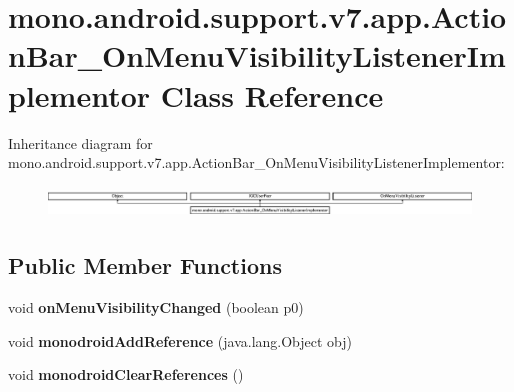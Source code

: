 \hypertarget{classmono_1_1android_1_1support_1_1v7_1_1app_1_1ActionBar__OnMenuVisibilityListenerImplementor}{}\section{mono.\+android.\+support.\+v7.\+app.\+Action\+Bar\+\_\+\+On\+Menu\+Visibility\+Listener\+Implementor Class Reference}
\label{classmono_1_1android_1_1support_1_1v7_1_1app_1_1ActionBar__OnMenuVisibilityListenerImplementor}
Inheritance diagram for mono.\+android.\+support.\+v7.\+app.\+Action\+Bar\+\_\+\+On\+Menu\+Visibility\+Listener\+Implementor\+:\begin{figure}[H]
\begin{center}
\leavevmode
\includegraphics[height=0.809834cm]{classmono_1_1android_1_1support_1_1v7_1_1app_1_1ActionBar__OnMenuVisibilityListenerImplementor}
\end{center}
\end{figure}
\subsection*{Public Member Functions}
\begin{DoxyCompactItemize}
\item 
\mbox{\label{classmono_1_1android_1_1support_1_1v7_1_1app_1_1ActionBar__OnMenuVisibilityListenerImplementor_a273ad4963b11410f46b1e918b47526e5}} 
void {\bfseries on\+Menu\+Visibility\+Changed} (boolean p0)
\item 
\mbox{\label{classmono_1_1android_1_1support_1_1v7_1_1app_1_1ActionBar__OnMenuVisibilityListenerImplementor_a120bb639390d4992edfcf6749c839108}} 
void {\bfseries monodroid\+Add\+Reference} (java.\+lang.\+Object obj)
\item 
\mbox{\label{classmono_1_1android_1_1support_1_1v7_1_1app_1_1ActionBar__OnMenuVisibilityListenerImplementor_a888aa1c7efc221057deab7c4d44d1e86}} 
void {\bfseries monodroid\+Clear\+References} ()
\end{DoxyCompactItemize}
